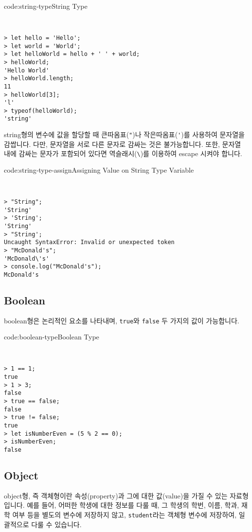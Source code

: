 \begin{codeenv}{code:string-type}{String Type}\begin{verbatim}


> let hello = 'Hello';
> let world = 'World';
> let helloWorld = hello + ' ' + world;
> helloWorld;
'Hello World'
> helloWorld.length;
11
> helloWorld[3];
'l'
> typeof(helloWorld);
'string'
\end{verbatim}
\end{codeenv}

string형의 변수에 값을 할당할 때 큰따옴표(\verb|"|)나 작은따옴표(\verb|'|)를 사용하여 문자열을 감쌉니다. 다만, 문자열을 서로 다른 문자로 감싸는 것은 불가능합니다. 또한, 문자열 내에 감싸는 문자가 포함되어 있다면 역슬래시(\verb|\|)를 이용하여 escape 시켜야 합니다. 

\begin{codeenv}{code:string-type-assign}{Assigning Value on String Type Variable}\begin{verbatim}


> "String";
'String'
> 'String';
'String'
> "String';
Uncaught SyntaxError: Invalid or unexpected token
> "McDonald's";
'McDonald\'s'
> console.log("McDonald's");
McDonald's
\end{verbatim}
\end{codeenv}

\subsection*{Boolean}

boolean형은 논리적인 요소를 나타내며, \verb|true|와 \verb|false| 두 가지의 값이 가능합니다. 

\begin{codeenv}{code:boolean-type}{Boolean Type}\begin{verbatim}


> 1 == 1;
true
> 1 > 3;
false
> true == false;
false
> true != false;
true
> let isNumberEven = (5 % 2 == 0);
> isNumberEven;
false
\end{verbatim}
\end{codeenv}

\subsection*{Object}

object형, 즉 객체형이란 속성(property)과 그에 대한 값(value)을 가질 수 있는 자료형입니다. 예를 들어, 어떠한 학생에 대한 정보를 다룰 때, 그 학생의 학번, 이름, 학과, 재학 여부 등을 별도의 변수에 저장하지 않고, \verb|student|라는 객체형 변수에 저장하여, 일괄적으로 다룰 수 있습니다. 

